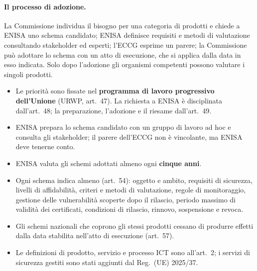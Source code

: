 \paragraph{Il processo di adozione.}
\begin{center}
\end{center}
La Commissione individua il bisogno per una categoria di prodotti e chiede a ENISA uno schema candidato;
ENISA definisce requisiti e metodi di valutazione consultando stakeholder ed esperti; l'ECCG esprime un
parere; la Commissione può adottare lo schema con un atto di esecuzione, che si applica dalla data in esso
indicata. Solo dopo l'adozione gli organismi competenti possono valutare i singoli prodotti.

\begin{integrazione}
\begin{itemize}
  \item Le priorità sono fissate nel \textbf{programma di lavoro progressivo dell'Unione} (URWP, art.~47).
    La richiesta a ENISA è disciplinata dall'art.~48; la preparazione, l'adozione e il riesame dall'art.~49.
  \item ENISA prepara lo schema candidato con un gruppo di lavoro ad hoc e consulta gli stakeholder; il
    parere dell'ECCG non è vincolante, ma ENISA deve tenerne conto.
  \item ENISA valuta gli schemi adottati almeno ogni \textbf{cinque anni}.
  \item Ogni schema indica almeno (art.~54): oggetto e ambito, requisiti di sicurezza, livelli di
    affidabilità, criteri e metodi di valutazione, regole di monitoraggio, gestione delle vulnerabilità
    scoperte dopo il rilascio, periodo massimo di validità dei certificati, condizioni di rilascio,
    rinnovo, sospensione e revoca.
  \item Gli schemi nazionali che coprono gli stessi prodotti cessano di produrre effetti dalla data
    stabilita nell'atto di esecuzione (art.~57).
  \item Le definizioni di prodotto, servizio e processo ICT sono all'art.~2; i servizi di sicurezza
    gestiti sono stati aggiunti dal Reg.~(UE) 2025/37.
\end{itemize}
\end{integrazione}

